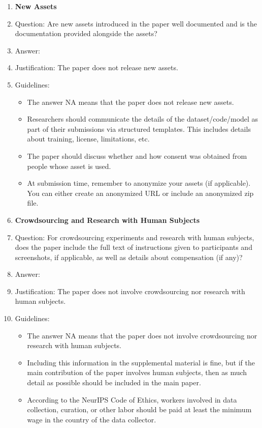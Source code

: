 \documentclass{article}
\begin{document}
\begin{enumerate}
\item {\bf New Assets}
    \item[] Question: Are new assets introduced in the paper well documented and is the documentation provided alongside the assets?
    \item[] Answer: \answerNA{} %
    \item[] Justification: The paper does not release new assets.
    \item[] Guidelines:
    \begin{itemize}
        \item The answer NA means that the paper does not release new assets.
        \item Researchers should communicate the details of the dataset/code/model as part of their submissions via structured templates. This includes details about training, license, limitations, etc. 
        \item The paper should discuss whether and how consent was obtained from people whose asset is used.
        \item At submission time, remember to anonymize your assets (if applicable). You can either create an anonymized URL or include an anonymized zip file.
    \end{itemize}

\item {\bf Crowdsourcing and Research with Human Subjects}
    \item[] Question: For crowdsourcing experiments and research with human subjects, does the paper include the full text of instructions given to participants and screenshots, if applicable, as well as details about compensation (if any)? 
    \item[] Answer: \answerNA{} %
    \item[] Justification: The paper does not involve crowdsourcing nor research with human subjects.
    \item[] Guidelines:
    \begin{itemize}
        \item The answer NA means that the paper does not involve crowdsourcing nor research with human subjects.
        \item Including this information in the supplemental material is fine, but if the main contribution of the paper involves human subjects, then as much detail as possible should be included in the main paper. 
        \item According to the NeurIPS Code of Ethics, workers involved in data collection, curation, or other labor should be paid at least the minimum wage in the country of the data collector. 
    \end{itemize}


\end{enumerate}
\end{document}
